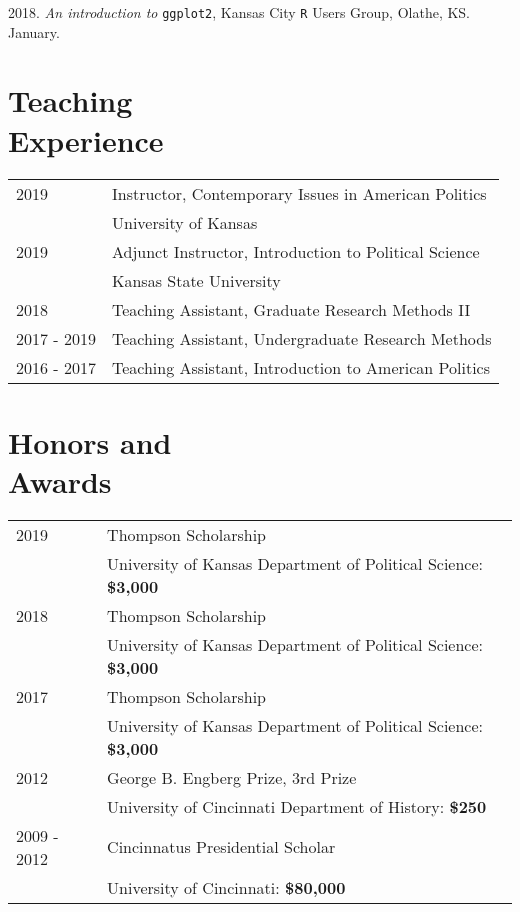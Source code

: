 \documentclass[margin,line,pifont,palatino,courier]{res}
\begin{document}
\begin{resume}
2018. \emph{An introduction to} \verb+ggplot2+, Kansas City \verb+R+ Users Group,
Olathe, KS. January.

\newpage
\section{\sc Teaching\\ Experience}

\begin{tabular}{@{}p{0.8in}p{3.5in}}
  2019        & Instructor, Contemporary Issues in American Politics\\
              & University of Kansas\\
  2019        & Adjunct Instructor, Introduction to Political Science\\
              & Kansas State University\\
  2018        & Teaching Assistant, Graduate Research Methods II\\
  2017 - 2019 & Teaching Assistant, Undergraduate Research Methods\\
  2016 - 2017 & Teaching Assistant, Introduction to American Politics\\
\end{tabular}



\section{\sc Honors and\\ Awards}

\begin{tabular}{@{}p{0.8in}p{4in}}
2019       & Thompson Scholarship\\
           & University of Kansas Department of Political Science: \bf{\$3,000}  \\
2018       & Thompson Scholarship\\
           & University of Kansas Department of Political Science: \bf{\$3,000}  \\
2017       & Thompson Scholarship\\
           & University of Kansas Department of Political Science: \bf{\$3,000}  \\
2012       & George B. Engberg Prize, 3rd Prize  \\
           & University of Cincinnati Department of History: \bf{\$250}  \\
2009 - 2012 & Cincinnatus Presidential Scholar\\
           & University of Cincinnati: \bf{\$80,000} \\
\end{tabular}


\end{resume}
\end{document}

